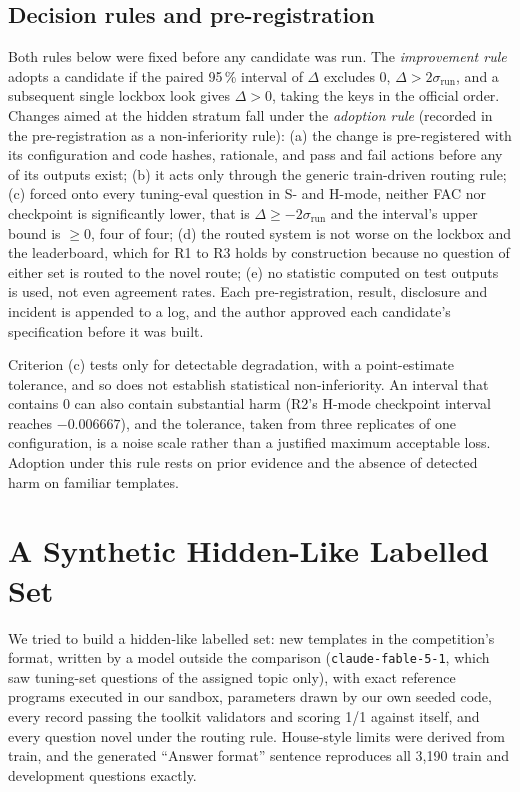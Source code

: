 \documentclass[conference]{IEEEtran}
\newcommand{\id}[1]{\texttt{#1}}
\begin{document}
\subsection{Decision rules and pre-registration}
Both rules below were fixed before any candidate was run. The \emph{improvement rule} adopts a candidate if the paired 95\,\% interval of $\Delta$ excludes 0, $\Delta>2\sigma_{\mathrm{run}}$, and a subsequent single lockbox look gives $\Delta>0$, taking the keys in the official order. Changes aimed at the hidden stratum fall under the \emph{adoption rule} (recorded in the pre-registration as a non-inferiority rule): (a) the change is pre-registered with its configuration and code hashes, rationale, and pass and fail actions before any of its outputs exist; (b) it acts only through the generic train-driven routing rule; (c) forced onto every tuning-eval question in S- and H-mode, neither FAC nor checkpoint is significantly lower, that is $\Delta\ge-2\sigma_{\mathrm{run}}$ and the interval's upper bound is $\ge0$, four of four; (d) the routed system is not worse on the lockbox and the leaderboard, which for R1 to R3 holds by construction because no question of either set is routed to the novel route; (e) no statistic computed on test outputs is used, not even agreement rates. Each pre-registration, result, disclosure and incident is appended to a log, and the author approved each candidate's specification before it was built.

Criterion (c) tests only for detectable degradation, with a point-estimate tolerance, and so does not establish statistical non-inferiority. An interval that contains 0 can also contain substantial harm (R2's H-mode checkpoint interval reaches $-0.006667$), and the tolerance, taken from three replicates of one configuration, is a noise scale rather than a justified maximum acceptable loss. Adoption under this rule rests on prior evidence and the absence of detected harm on familiar templates.

\section{A Synthetic Hidden-Like Labelled Set}\label{sec:synthetic}
We tried to build a hidden-like labelled set: new templates in the competition's format, written by a model outside the comparison (\id{claude-fable-5-1}, which saw tuning-set questions of the assigned topic only), with exact reference programs executed in our sandbox, parameters drawn by our own seeded code, every record passing the toolkit validators and scoring 1/1 against itself, and every question novel under the routing rule. House-style limits were derived from train, and the generated ``Answer format'' sentence reproduces all 3,190 train and development questions exactly.
\end{document}
